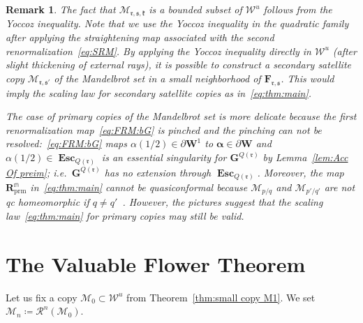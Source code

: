 \documentclass{amsart}
\newcommand{\1}{{\mathbb 1 }}
\newcommand{\Mandel}{{\mathcal{M}}}
\newcommand\MM{\mathscr{M}}
\newcommand\bMM{{\pmb {\MM}}}
\newcommand\RR{\mathcal{R}}
\newcommand\prm{{\operatorname{prm}}}
\newcommand\mRRc{ \boldsymbol R_{\prm}}%
\newcommand{\bF}{{\mathbf F}}
\newcommand{\bW}{{\mathbf W}}
\newcommand{\bG}{{\mathbf G}}
\newcommand{\mm}{\mathbb{m}}
\newcommand{\rr}{\mathfrak{r}}
\renewcommand{\ss}{\mathfrak{s}}
\newcommand{\kk}{\mathfrak{k}}
\newcommand\Unst{{\boldsymbol{\mathcal{W}}^u}}
\newtheorem{rem}[thm]{Remark}
\theoremstyle{remark}
\numberwithin{equation}{section}
\theoremstyle{definition}
\newcommand{\Esc}{{\boldsymbol{\operatorname{Esc}}}}
\newcommand{\balpha}{{\boldsymbol \alpha}}
\theoremstyle{nonumberbreak}
\begin{document}
\begin{rem}
The fact that $\bMM_{\rr,\ss,\kk}$ is a bounded subset of $\Unst$ follows from the Yoccoz inequality. Note that we use the Yoccoz inequality in the quadratic family after applying the straightening map associated with the second renormalization~\eqref{eq:SRM}. By applying the Yoccoz inequality directly in $\Unst$ (after slight thickening of external rays), it is possible to construct a \emph{secondary} satellite copy $\bMM_{\rr,\ss'}$ of the Mandelbrot set in a small neighborhood of $\bF_{\rr,\ss}$. This would imply the scaling law for secondary satellite copies as in~\eqref{eq:thm:main}.

The case of primary copies of the Mandelbrot set is more delicate because the first renormalization map~\eqref{eq:FRM:bG} is pinched and the pinching can not be resolved:~\eqref{eq:FRM:bG}  maps $\alpha(1/2)\in \partial \bW^1$ to $\balpha\in \partial \bW$ and $\alpha(1/2)\in \Esc_{Q(\rr)}$ is an essential singularity for $\bG^{Q(\rr)}$ by Lemma~\ref{lem:Acc Of preim}; i.e.~$\bG^{Q(\rr)}$ has no extension through $\Esc_{Q(\rr)}$. Moreover, the map $\mRRc^\mm$ in~\eqref{eq:thm:main} cannot be quasiconformal because $\Mandel_{p/q}$ and $\Mandel_{p'/q'}$ are not qc homeomorphic if $q\not=q'$~\cite{LP}. However, the pictures suggest that the scaling law~\eqref{eq:thm:main} for primary copies may still be valid.
\end{rem}



\section{The Valuable Flower Theorem}
\label{s:val flow}





Let us fix a copy $\bMM_0\subset \Unst$ from Theorem~\ref{thm:small copy M1}. We set $\bMM_{n}\coloneqq \RR^{n}(\bMM_0)$. 
\end{document}
